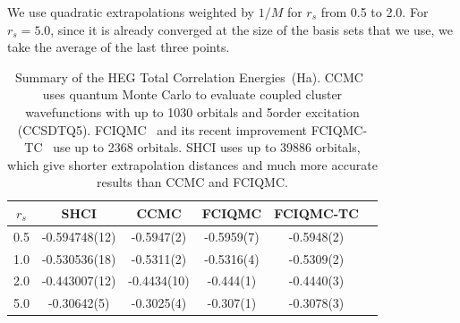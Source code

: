 We use quadratic extrapolations weighted by $1/M$ for $r_s$ from 0.5 to 2.0.
For $r_s=5.0$, since it is already converged at the size of the basis sets that we use, we take the average of the last three points.
\begin{table}
\caption{Summary of the HEG Total Correlation Energies~(Ha).
CCMC~\cite{neufeld2017study} uses quantum Monte Carlo to evaluate coupled cluster wavefunctions with up to 1030 orbitals and 5\nth order excitation (CCSDTQ5).
FCIQMC~\cite{shepherd2012full} and its recent improvement FCIQMC-TC~\cite{luo2018combining} use up to 2368 orbitals.
SHCI uses up to 39886 orbitals, which give shorter extrapolation distances and much more accurate results than CCMC and FCIQMC.
}
\label{tab:results}
\begin{tabular}{| c || c || c | c | c | c |}
 \hline
 $r_s$ & SHCI & CCMC & FCIQMC & FCIQMC-TC \\
 \hline\hline
 0.5 & -0.594748(12) & -0.5947(2) & -0.5959(7) & -0.5948(2)\\
 \hline
 1.0 & -0.530536(18) & -0.5311(2) & -0.5316(4) & -0.5309(2)\\
 \hline
 2.0 & -0.443007(12) & -0.4434(10) & -0.444(1) & -0.4440(3)\\
 \hline
 5.0 & -0.30642(5) & -0.3025(4) & -0.307(1) & -0.3078(3)\\
 \hline
\end{tabular}
\end{table}

